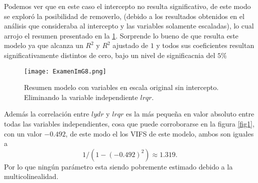 \documentclass[10.5pt,notitlepage]{article}
\theoremstyle{plain}
\begin{document}
Podemos ver que en este caso el intercepto no resulta significativo, de este modo se exploró la posibilidad de removerlo, (debido a los resultados obtenidos en el análisis que consideraba al intercepto y las variables solamente escaladas), lo cual arrojo el resumen presentado en la \ref{fig8}. Sorprende lo bueno de que resulta este modelo ya que alcanza un \(R^2\) y \(R^2\) ajustado de \(1\) y todos sus coeficientes resultan significativamente distintos de cero, bajo un nivel de significacnia del \(5\%\)
\begin{figure}[htb]
 \centering
 \texttt{[image: ExamenImG8.png]}
 \caption{Resumen modelo con variables en escala original sin intercepto. Eliminando la variable independiente \(lrqr\).}
\label{fig8}
\end{figure}
Además la correlación entre \(lydr\) y \(lrqr\) es la más pequeña en valor absoluto entre todas las variables independientes, cosa que puede corroborarse en la figura \ref{fig1}, con un valor \(-0.492\), de este modo el los VIFS de este modelo, ambos son iguales a 
\begin{equation*}
    1/(1 - (-0.492)^2) \approx 1.319. 
\end{equation*}
Por lo que ningún parámetro esta siendo pobremente estimado debido a la multicolinealidad. \\ 
\end{document}
